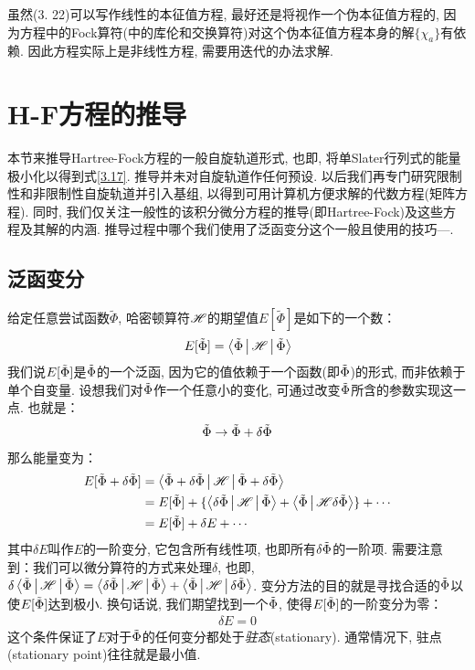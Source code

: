 虽然(3.
22)可以写作线性的本征值方程, 
最好还是将视作一个伪本征值方程的, 
因为方程中的Fock算符(中的库伦和交换算符)对这个伪本征值方程本身的解$\{\chi_a \}$有依赖. 
因此\hft 方程实际上是非线性方程, 
需要用迭代的办法求解.

\section{H-F方程的推导}
本节来推导Hartree-Fock方程的一般自旋轨道形式, 
也即, 
将单Slater行列式的能量极小化以得到式\eqref{3.17}. 
推导并未对自旋轨道作任何预设. 
以后我们再专门研究限制性和非限制性自旋轨道并引入基组, 
以得到可用计算机方便求解的代数方程(矩阵方程). 
同时, 
我们仅关注一般性的该积分微分方程的推导(即Hartree-Fock)及这些方程及其解的内涵. 
推导过程中哪个我们使用了泛函变分这个一般且使用的技巧—. 

\subsection{泛函变分}
给定任意尝试函数$\tilde{\Phi}$, 
哈密顿算符$\mathscr{H}$的期望值$E[\tilde{\Phi}]$是如下的一个数：
\begin{align}
	E[\tilde{\Phi}] = \Braket{\tilde{\Phi}|\mathscr{H}|\tilde{\Phi}}
\end{align}
我们说$E[\tilde{\Phi}]$是$\tilde{\Phi}$的一个泛函, 
因为它的值依赖于一个函数(即$\tilde{\Phi}$)的形式, 
而非依赖于单个自变量. 
设想我们对$\tilde{\Phi}$作一个任意小的变化, 
可通过改变$\tilde{\Phi}$所含的参数实现这一点. 
也就是：
\begin{align}
	\tilde{\Phi} \to \tilde{\Phi} + \delta\tilde{\Phi}
\end{align} 
那么能量变为：
\begin{align}
	E[\tilde{\Phi}+\delta\tilde{\Phi}] & = \Braket{\tilde{\Phi}+\delta\tilde{\Phi}|\mathscr{H}|\tilde{\Phi}+\delta\tilde{\Phi}} \notag\\
	& = E[\tilde{\Phi}] + \{ \Braket{\delta\tilde{\Phi}|\mathscr{H}|\tilde{\Phi}} + \Braket{\tilde{\Phi}|\mathscr{H}\delta\tilde{\Phi}} \} + \cdots \notag\\
	& = E[\tilde{\Phi}] + \delta E + \cdots
\end{align}
其中$\delta E$叫作$E$的一阶变分, 
它包含所有线性项, 
也即所有$\delta\tilde{\Phi}$的一阶项. 
需要注意到：我们可以微分算符的方式来处理$\delta$, 
也即, 
$\delta\Braket{\tilde{\Phi}|\mathscr{H}|\tilde{\Phi}} = \Braket{\delta\tilde{\Phi}|\mathscr{H}|\tilde{\Phi}} + \Braket{\tilde{\Phi}|\mathscr{H}|\delta\tilde{\Phi}}$. 
变分方法的目的就是寻找合适的$\tilde{\Phi}$以使$E[\tilde{\Phi}]$达到极小. 
换句话说, 
我们期望找到一个$\tilde{\Phi}$, 
使得$E[\tilde{\Phi}]$的一阶变分为零：
\begin{align}
	\delta E = 0
\end{align}
这个条件保证了$E$对于$\tilde{\Phi}$的任何变分都处于\emph{驻态}(stationary). 
通常情况下, 
驻点(stationary point)往往就是最小值.


